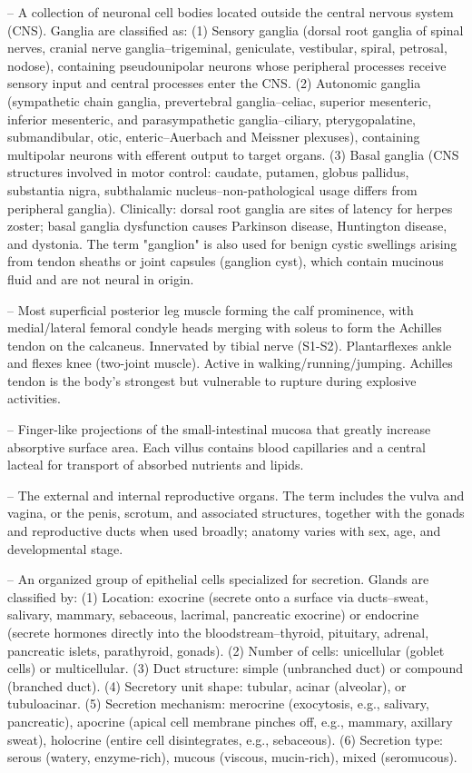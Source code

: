 -- A collection of neuronal cell bodies located outside the central nervous system (CNS). Ganglia are classified as: (1) Sensory ganglia (dorsal root ganglia of spinal nerves, cranial nerve ganglia--trigeminal, geniculate, vestibular, spiral, petrosal, nodose), containing pseudounipolar neurons whose peripheral processes receive sensory input and central processes enter the CNS. (2) Autonomic ganglia (sympathetic chain ganglia, prevertebral ganglia--celiac, superior mesenteric, inferior mesenteric, and parasympathetic ganglia--ciliary, pterygopalatine, submandibular, otic, enteric--Auerbach and Meissner plexuses), containing multipolar neurons with efferent output to target organs. (3) Basal ganglia (CNS structures involved in motor control: caudate, putamen, globus pallidus, substantia nigra, subthalamic nucleus--non-pathological usage differs from peripheral ganglia). Clinically: dorsal root ganglia are sites of latency for herpes zoster; basal ganglia dysfunction causes Parkinson disease, Huntington disease, and dystonia. The term "ganglion" is also used for benign cystic swellings arising from tendon sheaths or joint capsules (ganglion cyst), which contain mucinous fluid and are not neural in origin.

-- Most superficial posterior leg muscle forming the calf prominence, with medial/lateral femoral condyle heads merging with soleus to form the Achilles tendon on the calcaneus. Innervated by tibial nerve (S1-S2). Plantarflexes ankle and flexes knee (two-joint muscle). Active in walking/running/jumping. Achilles tendon is the body's strongest but vulnerable to rupture during explosive activities.

-- Finger-like projections of the small-intestinal mucosa that greatly increase absorptive surface area. Each villus contains blood capillaries and a central lacteal for transport of absorbed nutrients and lipids.

-- The external and internal reproductive organs. The term includes the vulva and vagina, or the penis, scrotum, and associated structures, together with the gonads and reproductive ducts when used broadly; anatomy varies with sex, age, and developmental stage.

-- An organized group of epithelial cells specialized for secretion. Glands are classified by: (1) Location: exocrine (secrete onto a surface via ducts--sweat, salivary, mammary, sebaceous, lacrimal, pancreatic exocrine) or endocrine (secrete hormones directly into the bloodstream--thyroid, pituitary, adrenal, pancreatic islets, parathyroid, gonads). (2) Number of cells: unicellular (goblet cells) or multicellular. (3) Duct structure: simple (unbranched duct) or compound (branched duct). (4) Secretory unit shape: tubular, acinar (alveolar), or tubuloacinar. (5) Secretion mechanism: merocrine (exocytosis, e.g., salivary, pancreatic), apocrine (apical cell membrane pinches off, e.g., mammary, axillary sweat), holocrine (entire cell disintegrates, e.g., sebaceous). (6) Secretion type: serous (watery, enzyme-rich), mucous (viscous, mucin-rich), mixed (seromucous).

